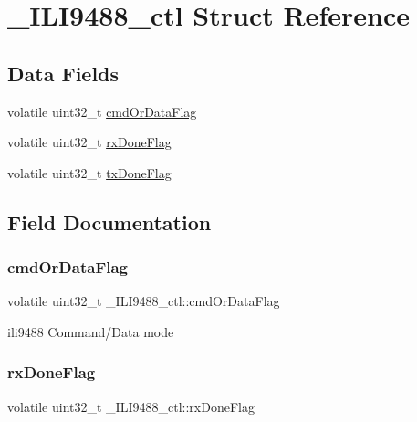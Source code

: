 \hypertarget{struct__ILI9488__ctl}{}\section{\+\_\+\+I\+L\+I9488\+\_\+ctl Struct Reference}
\label{struct__ILI9488__ctl}
\subsection*{Data Fields}
\begin{DoxyCompactItemize}
\item 
volatile uint32\+\_\+t \mbox{\hyperlink{struct__ILI9488__ctl_a3902c14e6de12577e77b981db74afe28}{cmd\+Or\+Data\+Flag}}
\item 
volatile uint32\+\_\+t \mbox{\hyperlink{struct__ILI9488__ctl_acf841da0ad82c5ed1f2a185f83983fb7}{rx\+Done\+Flag}}
\item 
volatile uint32\+\_\+t \mbox{\hyperlink{struct__ILI9488__ctl_aa907fcd37359f7542fe34ff4dac957ca}{tx\+Done\+Flag}}
\end{DoxyCompactItemize}


\subsection{Field Documentation}
\mbox{\label{struct__ILI9488__ctl_a3902c14e6de12577e77b981db74afe28}} 
\subsubsection{\texorpdfstring{cmdOrDataFlag}{cmdOrDataFlag}}
{\footnotesize\ttfamily volatile uint32\+\_\+t \+\_\+\+I\+L\+I9488\+\_\+ctl\+::cmd\+Or\+Data\+Flag}

ili9488 Command/\+Data mode \mbox{\label{struct__ILI9488__ctl_acf841da0ad82c5ed1f2a185f83983fb7}} 
\subsubsection{\texorpdfstring{rxDoneFlag}{rxDoneFlag}}
{\footnotesize\ttfamily volatile uint32\+\_\+t \+\_\+\+I\+L\+I9488\+\_\+ctl\+::rx\+Done\+Flag}


